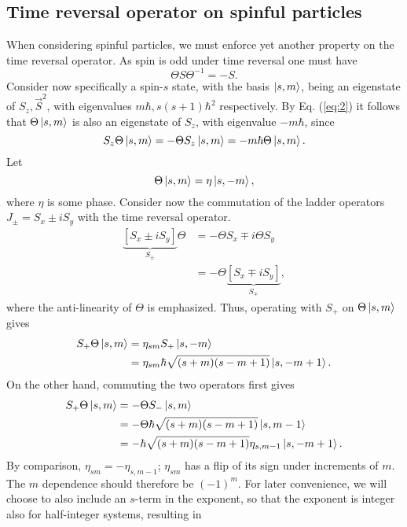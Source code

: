\subsection{Time reversal operator on spinful particles}
When considering spinful particles, we must enforce yet another property on the time reversal operator.
As spin is odd under time reversal one must have
\begin{equation}
  \label{eq:2}
  \Theta S \Theta^{-1} = -S.
\end{equation}
Consider now specifically a spin-$s$ state, with the basis $\ket{s, m}$, being an eigenstate of $S_z, \vec{S}^2$, with eigenvalues $m\hbar, s(s+1) \hbar^2$ respectively.
By Eq. (\ref{eq:2}) it follows that $\Theta \ket{s, m}$ is also an  eigenstate of $S_z$, with eigenvalue $-m \hbar $, since
\begin{equation}
  S_z \Theta \ket{s, m} = -\Theta  S_z \ket{s, m} = -m \hbar \Theta \ket{s, m}.
\end{equation}
Let
\[
  \Theta \ket{s, m} = \eta \ket{s, -m},
\]
where $\eta $ is some phase.
Consider now the commutation of the ladder operators $J_{\pm} = S_x \pm i S_y$ with the time reversal operator.
\begin{equation}
  \begin{split}
    \underbrace{\left[ S_x \pm i S_y \right]}_{S_{\pm}} \Theta  &= -\Theta S_x \mp i \Theta S_y\\
    &= -\Theta \underbrace{\left[ S_x \mp iS_y \right]}_{S_{\mp}},
  \end{split}
\end{equation}
where the anti-linearity of $\Theta $ is emphasized.
Thus, operating with $S_+$ on $\Theta \ket{s, m}$ gives
\begin{align}
  S_+ \Theta \ket{s, m} &= \eta_{sm} S_+ \ket{s, -m}\\
  &= \eta_{sm} \hbar \sqrt{(s+m) (s-m+1)} \ket{s, -m +  1}.
\end{align}
On the other hand, commuting the two operators first gives
\begin{align}
  S_+ \Theta  \ket{s, m} &= - \Theta  S_- \ket{s, m}\\
                         &= - \Theta \hbar \sqrt{(s+m)(s-m+1)} \ket{s, m-1}\\
  &= -\hbar \sqrt{(s+m)(s-m+1)} \eta_{s, m-1} \ket{s, -m + 1}.
\end{align}
By comparison, $\eta _{sm}= - \eta _{s, m-1}$; $\eta _{sm}$ has a flip of its sign under increments of $m$.
The $m$ dependence should therefore be $(-1)^m$.
For later convenience, we will choose to also include an $s$-term in the exponent, so that the exponent is integer also for half-integer systems, resulting in
